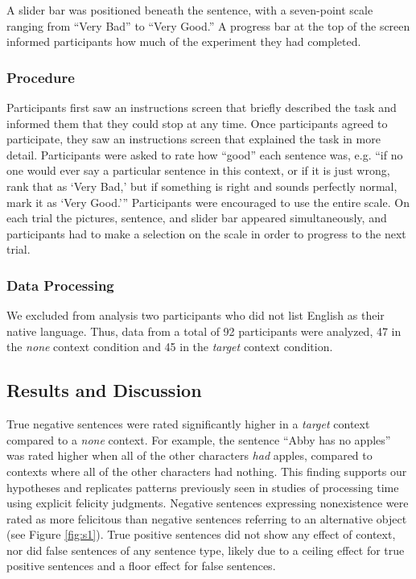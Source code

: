 \documentclass[10pt,letterpaper]{article}
\begin{document}
A slider bar was positioned beneath the sentence, with a seven-point scale ranging from ``Very Bad'' to ``Very Good.''  A progress bar at the top of the screen informed participants how much of the experiment they had completed. 

\subsubsection{Procedure}

Participants first saw an instructions screen that briefly described the task and informed them that they could stop at any time.  Once participants agreed to participate, they saw an instructions screen that explained the task in more detail.  Participants were asked to rate how ``good'' each sentence was, e.g. ``if no one would ever say a particular sentence in this context, or if it is just wrong, rank that as `Very Bad,' but if something is right and sounds perfectly normal, mark it as `Very Good.''' Participants were encouraged to use the entire scale. On each trial the pictures, sentence, and slider bar appeared simultaneously, and participants had to make a selection on the scale in order to progress to the next trial.  


\subsubsection{Data Processing}

We excluded from analysis two participants who did not list English as their native language.  Thus, data from a total of 92 participants were analyzed, 47 in the \emph{none} context condition and 45 in the \emph{target} context condition.  

\subsection{Results and Discussion}

True negative sentences were rated significantly higher in a \emph{target} context compared to a \emph{none} context. For example, the sentence ``Abby has no apples'' was rated higher when all of the other characters \emph{had} apples, compared to contexts where all of the other characters had nothing. This finding supports our hypotheses and replicates patterns previously seen in studies of processing time using explicit felicity judgments.  Negative sentences expressing nonexistence were rated as more felicitous than negative sentences referring to an alternative object (see Figure \ref{fig:s1}). True positive sentences did not show any effect of context, nor did false sentences of any sentence type, likely due to a ceiling effect for true positive sentences and a floor effect for false sentences.  
 
\end{document}

